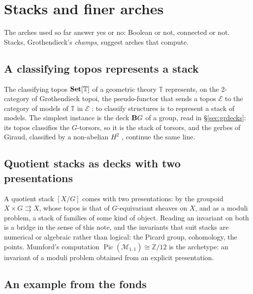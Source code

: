 \section{Stacks and finer arches}\label{sec:stacks}

The arches used so far answer yes or no: Boolean or not, connected or not. Stacks, Grothendieck's \emph{champs}, suggest arches that compute.

\subsection{A classifying topos represents a stack}

The classifying topos $\mathbf{Set}[\mathbb T]$ of a geometric theory $\mathbb T$ represents, on the 2-category of Grothendieck topoi, the pseudo-functor that sends a topos $\mathcal E$ to the category of models of $\mathbb T$ in $\mathcal E$ \cite{caramello-tst}: to classify structures is to represent a stack of models. The simplest instance is the deck $\mathbf{B} G$ of a group, read in \S\ref{sec:grdecks}: its topos classifies the $G$-torsors, so it is the stack of torsors, and the gerbes of Giraud, classified by a non-abelian $H^2$ \cite{giraud}, continue the same line.

\subsection{Quotient stacks as decks with two presentations}

A quotient stack $[X/G]$ comes with two presentations: by the groupoid $X\times G\rightrightarrows X$, whose topos is that of $G$-equivariant sheaves on $X$, and as a moduli problem, a stack of families of some kind of object. Reading an invariant on both is a bridge in the sense of this note, and the invariants that suit stacks are numerical or algebraic rather than logical: the Picard group, cohomology, the points. Mumford's computation $\operatorname{Pic}(\mathcal M_{1,1})\cong\mathbb Z/12$ \cite{mumford} is the archetype: an invariant of a moduli problem obtained from an explicit presentation.

\subsection{An example from the fonds}

